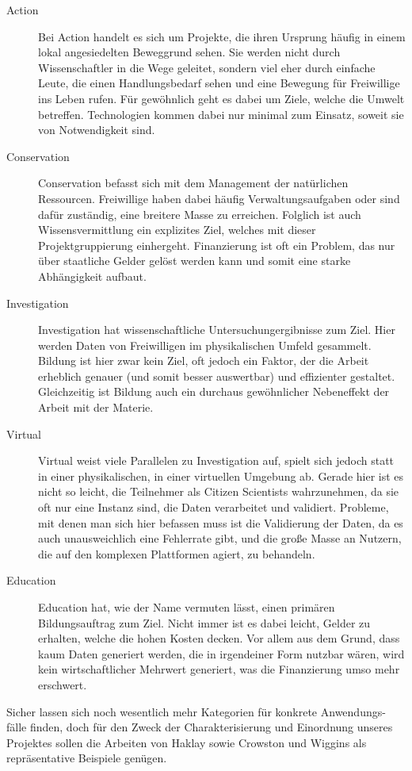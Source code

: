 \documentclass{article}
\begin{document}
\begin{description}
\item[Action]
Bei Action handelt es sich um Projekte, die ihren Ursprung häufig in einem lokal angesiedelten Beweggrund sehen.
Sie werden nicht durch Wissenschaftler in die Wege geleitet,
sondern viel eher durch einfache Leute, die einen Handlungsbedarf sehen und eine Bewegung für Freiwillige ins Leben rufen.
Für gewöhnlich geht es dabei um Ziele, welche die Umwelt betreffen.
Technologien kommen dabei nur minimal zum Einsatz, soweit sie von Notwendigkeit sind.
\item[Conservation]
Conservation befasst sich mit dem Management der natürlichen Ressourcen.
Freiwillige haben dabei häufig Verwaltungsaufgaben oder sind dafür zuständig, eine breitere Masse zu erreichen.
Folglich ist auch Wissensvermittlung ein explizites Ziel, welches mit dieser Projektgruppierung einhergeht.
Finanzierung ist oft ein Problem, das nur über staatliche Gelder gelöst werden kann und somit eine starke Abhängigkeit aufbaut.
\item[Investigation]
Investigation hat wissenschaftliche Untersuchungergibnisse zum Ziel.
Hier werden Daten von Freiwilligen im physikalischen Umfeld gesammelt.
Bildung ist hier zwar kein Ziel, oft jedoch ein Faktor, der die Arbeit erheblich genauer (und somit besser auswertbar) und effizienter gestaltet.
Gleichzeitig ist Bildung auch ein durchaus gewöhnlicher Nebeneffekt der Arbeit mit der Materie.
\item[Virtual]
Virtual weist viele Parallelen zu Investigation auf, spielt sich jedoch statt in einer physikalischen, in einer virtuellen Umgebung ab.
Gerade hier ist es nicht so leicht, die Teilnehmer als Citizen Scientists wahrzunehmen, da sie oft nur eine Instanz sind, die Daten verarbeitet und validiert.
Probleme, mit denen man sich hier befassen muss ist die Validierung der Daten, da es auch unausweichlich eine Fehlerrate gibt,
und die große Masse an Nutzern, die auf den komplexen Plattformen agiert, zu behandeln.
\item[Education]
Education hat, wie der Name vermuten lässt, einen primären Bildungsauftrag zum Ziel.
Nicht immer ist es dabei leicht, Gelder zu erhalten, welche die hohen Kosten decken.
Vor allem aus dem Grund, dass kaum Daten generiert werden, die in irgendeiner Form nutzbar wären, wird kein wirtschaftlicher Mehrwert generiert,
was die Finanzierung umso mehr erschwert.
\end{description}
Sicher lassen sich noch wesentlich mehr Kategorien für konkrete Anwendungs-fälle finden,
doch für den Zweck der Charakterisierung und Einordnung unseres Projektes sollen die Arbeiten von Haklay sowie Crowston und Wiggins als repräsentative Beispiele genügen.
\end{document}
